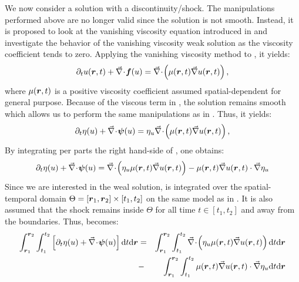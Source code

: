 We now consider a solution with a discontinuity/shock. The manipulations performed above are no longer valid since the solution is not smooth. Instead, it is proposed to look at the vanishing viscosity equation introduced in  and investigate the behavior of the vanishing viscosity weak solution as the viscosity coefficient tends to zero. Applying the vanishing viscosity method to , it yields:
%
\begin{equation}\label{eq:weak_sol7_sct1b}
\partial_t u( \boldsymbol r, t) + \vec{\nabla}\! \cdot \! \boldsymbol f(u) = \vec{\nabla}\! \cdot \! \left( \mu(\boldsymbol r,t ) \vec{\nabla} u( \boldsymbol r,t) \right),
\end{equation}
%
where $\mu(\boldsymbol r,t )$ is a positive viscosity coefficient assumed spatial-dependent for general purpose. Because of the viscous term in , the solution remains smooth which allows us to perform the same manipulations as in . Thus, it yields:
%
\begin{equation}\label{eq:weak_sol8_sct1b}
\partial_t \eta (u) + \vec{\nabla}\! \cdot \! \boldsymbol\psi (u) = \eta_u \vec{\nabla}\! \cdot \! \left( \mu(\boldsymbol r,t ) \vec{\nabla} u( \boldsymbol r,t) \right),
\end{equation}
%
By integrating per parts the right hand-side of , one obtains: 
%
\begin{equation}\label{eq:weak_sol9_sct1b}
\partial_t \eta (u) + \vec{\nabla}\! \cdot \! \boldsymbol\psi (u) =  \vec{\nabla}\! \cdot \! \left( \eta_u \mu(\boldsymbol r,t ) \vec{\nabla} u( \boldsymbol r,t) \right) - \mu(\boldsymbol r,t ) \vec{\nabla} u( \boldsymbol r,t) \cdot \vec{\nabla} \eta_u
\end{equation}
%
Since we are interested in the weal solution,  is integrated over the spatial-temporal domain $\Theta = \left[ \boldsymbol r_1,\boldsymbol r_2 \right] \times \left[ t_1,t_2 \right]$ on the same model as in . It is also assumed that the shock remains inside $\Theta$ for all time $t \in \left[ t_1, t_2 \right]$ and away from the boundaries. Thus,  becomes:
%
\begin{eqnarray}\label{eq:weak_sol10_sct1b}
\int_{\boldsymbol r_1}^{\boldsymbol r_2} \int_{t_1}^{t_2} \left[ \partial_t \eta (u) + \vec{\nabla}\! \cdot \! \boldsymbol\psi (u) \right] \text{d}t \text{d} \boldsymbol r  &=&
\int_{\boldsymbol r_1}^{\boldsymbol r_2} \int_{t_1}^{t_2}  \vec{\nabla}\! \cdot \! \left( \eta_u \mu(\boldsymbol r,t ) \vec{\nabla} u( \boldsymbol r,t) \right) \text{d}t \text{d} \boldsymbol r   \nonumber \\
&-& \int_{\boldsymbol r_1}^{\boldsymbol r_2} \int_{t_1}^{t_2}  \mu(\boldsymbol r,t ) \vec{\nabla} u( \boldsymbol r,t) \cdot \vec{\nabla} \eta_u \text{d}t \text{d} \boldsymbol r 
\end{eqnarray}
